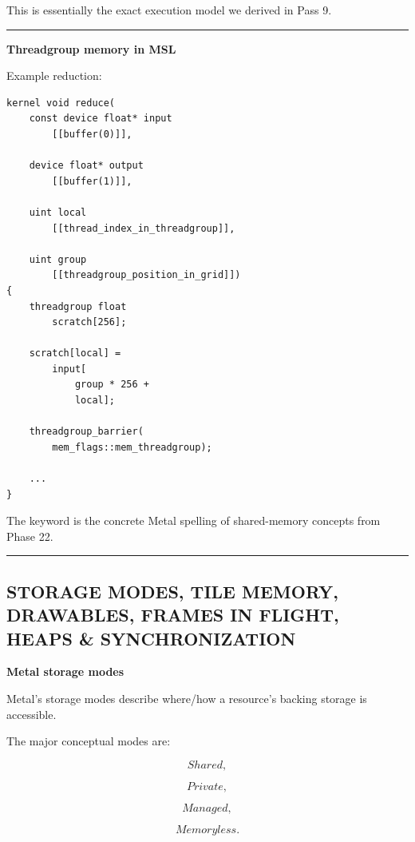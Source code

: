 This is essentially the exact execution model we derived in Pass 9.

\begin{center}\rule{0.5\linewidth}{0.5pt}\end{center}

\textbf{Threadgroup memory in MSL}

Example reduction:

\begin{verbatim}
kernel void reduce(
    const device float* input
        [[buffer(0)]],

    device float* output
        [[buffer(1)]],

    uint local
        [[thread_index_in_threadgroup]],

    uint group
        [[threadgroup_position_in_grid]])
{
    threadgroup float
        scratch[256];

    scratch[local] =
        input[
            group * 256 +
            local];

    threadgroup_barrier(
        mem_flags::mem_threadgroup);

    ...
}
\end{verbatim}

The keyword  is the concrete Metal spelling of shared-memory concepts from Phase 22.

\begin{center}\rule{0.5\linewidth}{0.5pt}\end{center}

\subsection{STORAGE MODES, TILE MEMORY, DRAWABLES, FRAMES IN FLIGHT, HEAPS \& SYNCHRONIZATION}\label{05-engine-i-ch023-storage-modes-tile-memory-drawables-frames-in-flight-heaps-synchronization}

\hypertarget{05-engine-i-ch023-storage-modes-tile-memory-drawables-frames-in-flight-heaps-synchronization}{}

\textbf{Metal storage modes}

Metal's storage modes describe where/how a resource's backing storage is accessible.

The major conceptual modes are:

\[
Shared,
\]

\[
Private,
\]

\[
Managed,
\]

\[
Memoryless.
\]

